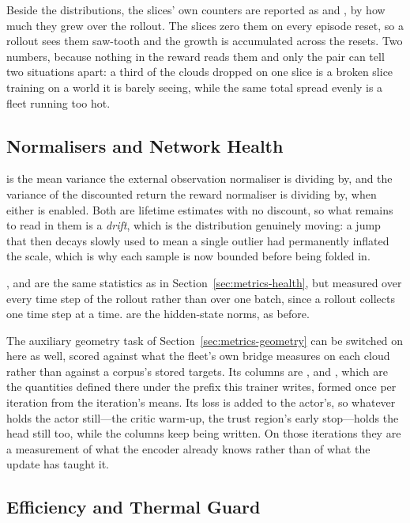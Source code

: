 Beside the distributions, the slices' own counters are reported as
 and , by how much
they grew over the rollout. The slices zero them on every episode reset, so a
rollout sees them saw-tooth and the growth is accumulated across the resets.
Two numbers, because nothing in the reward reads them and only the pair can
tell two situations apart: a third of the clouds dropped on one slice is a
broken slice training on a world it is barely seeing, while the same total
spread evenly is a fleet running too hot.

\subsection{Normalisers and Network Health}
\label{sec:metrics-rl-health}

 is the mean variance the external observation
normaliser is dividing by, and  the variance of the discounted
return the reward normaliser is dividing by, when either is enabled. Both are
lifetime estimates with no discount, so what remains to read in them is a
\emph{drift}, which is the distribution genuinely moving: a jump that then
decays slowly used to mean a single outlier had permanently inflated the
scale, which is why each sample is now bounded before being folded in.

,  and  are the same
statistics as in Section~\ref{sec:metrics-health}, but measured over every
time step of the rollout rather than over one batch, since a rollout collects
one time step at a time.  are the hidden-state
norms, as before.

The auxiliary geometry task of Section~\ref{sec:metrics-geometry} can be
switched on here as well, scored against what the fleet's own bridge measures
on each cloud rather than against a corpus's stored targets. Its columns are
,  and , which
are the quantities defined there under the prefix this trainer writes, formed
once per iteration from the iteration's means. Its loss is added to the
actor's, so whatever holds the actor still---the critic warm-up, the trust
region's early stop---holds the head still too, while the columns keep being
written. On those iterations they are a measurement of what the encoder
already knows rather than of what the update has taught it.

\subsection{Efficiency and Thermal Guard}
\label{sec:metrics-rl-cost}

